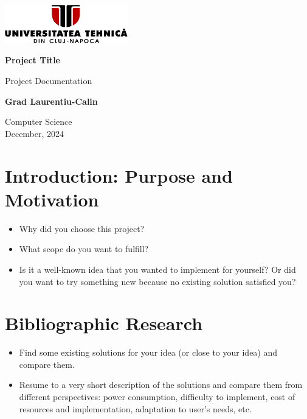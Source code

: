 \documentclass[12pt]{article}
\begin{document}
			\begin{titlepage}
				\centering
				
				\includegraphics[width=0.4\textwidth]{logo.png}\\
				\vspace*{6cm}
				
				\Huge
				\textbf{Project Title}
				
				\vspace{0.5cm}
				\Large
				Project Documentation
				
				\vspace{1.5cm}
				
				\textbf{Grad Laurentiu-Calin}\\
				
				\vfill
				
				\Large
				Computer Science\\
				December, 2024\\
				
			\end{titlepage}
			
	\newpage
	\tableofcontents
	\newpage
	
	\section{Introduction: Purpose and Motivation}
	\begin{itemize}
		\item Why did you choose this project?
		\item What scope do you want to fulfill?
		\item Is it a well-known idea that you wanted to implement for yourself? Or did you want to try something new because no existing solution satisfied you?
	\end{itemize}
	
	
	
	\section{Bibliographic Research}
	\begin{itemize}
		\item Find some existing solutions for your idea (or close to your idea) and compare them.
		\item Resume to a very short description of the solutions and compare them from different perspectives: power consumption, difficulty to implement, cost of resources and implementation, adaptation to user's needs, etc.
	\end{itemize}
	
\end{document}
